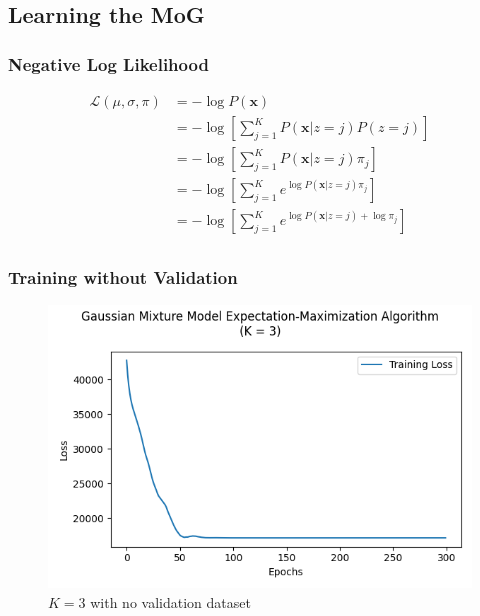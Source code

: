 \documentclass[letterpaper]{article}
\begin{document}
\newpage

\subsection{Learning the MoG}

\subsubsection{Negative Log Likelihood}

\begin{align*}
\mathcal{L}(\mu, \sigma, \pi) &= -\log P(\textbf{x}) \\
&=
-\log \left[ \sum_{j = 1}^{K} P(\textbf{x} | z = j) P(z = j) \right] \\
&=
-\log \left[ \sum_{j = 1}^{K} P(\textbf{x} | z = j) \pi_j \right] \\
&=
-\log \left[ \sum_{j = 1}^{K} e^{\log P(\textbf{x} | z = j) \pi_j} \right] \\
&=
-\log \left[ \sum_{j = 1}^{K} e^{\log P(\textbf{x} | z = j) + \log \pi_j} \right] \\
\end{align*}

\subsubsection{Training without Validation}

\begin{figure}[H]
	\centering
	\includegraphics[width=\linewidth]{Figure_7}
	\caption{$K = 3$ with no validation dataset}
	\label{fig:plot7}
\end{figure}
\end{document}
